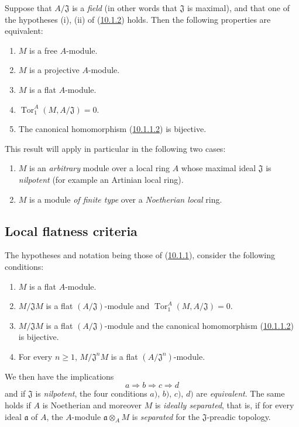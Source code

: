 \begin{env}[10.1.3]
\label{0.10.1.3}
Suppose that $A/\mathfrak{J}$ is a \emph{field} (in other words that
$\mathfrak{J}$ is maximal), and that one of the hypotheses (i), (ii) of
(\hyperref[0.10.1.2]{10.1.2}) holds. Then the following properties
are equivalent:
\begin{enumerate}
  \item[$a)$] $M$ is a free $A$-module.
  \item[$b)$] $M$ is a projective $A$-module.
  \item[$c)$] $M$ is a flat $A$-module.
  \item[$d)$] $\operatorname{Tor}_1^A(M,A/\mathfrak{J})=0$.
  \item[$e)$] The canonical homomorphism
    (\hyperref[0.10.1.1.2]{10.1.1.2}) is bijective.
\end{enumerate}
This result will apply in particular in the following two cases:
\begin{enumerate}
  \item[(i)] $M$ is an \emph{arbitrary} module over a local ring $A$ whose
    maximal ideal $\mathfrak{J}$ is \emph{nilpotent} (for example an Artinian
    local ring).
  \item[(ii)] $M$ is a module \emph{of finite type} over a
    \emph{Noetherian local} ring.
\end{enumerate}
\end{env}

\subsection{Local flatness criteria}
\label{subsection:0.10.2}

\begin{env}[10.2.1]
\label{0.10.2.1}
The hypotheses and notation being those of
(\hyperref[0.10.1.1]{10.1.1}), consider the following conditions:
\begin{enumerate}
  \item[$a)$] $M$ is a flat $A$-module.
  \item[$b)$] $M/\mathfrak{J}M$ is a flat $(A/\mathfrak{J})$-module and
    $\operatorname{Tor}_1^A(M,A/\mathfrak{J})=0$.
  \item[$c)$] $M/\mathfrak{J}M$ is a flat $(A/\mathfrak{J})$-module and
    the canonical homomorphism (\hyperref[0.10.1.1.2]{10.1.1.2}) is
    bijective.
  \item[$d)$] For every $n\geq1$, $M/\mathfrak{J}^nM$ is a flat
    $(A/\mathfrak{J}^n)$-module.
\end{enumerate}
We then have the implications
\[
  a\Rightarrow b\Rightarrow c\Rightarrow d
\]
and if $\mathfrak{J}$ is \emph{nilpotent}, the four conditions $a)$, $b)$,
$c)$, $d)$ are \emph{equivalent}. The same holds if $A$ is Noetherian
and moreover $M$ is \emph{ideally separated}, that is, if for every
ideal $\mathfrak{a}$ of $A$, the $A$-module $\mathfrak{a}\otimes_A M$ is
\emph{separated} for the $\mathfrak{J}$-preadic topology.
\end{env}

